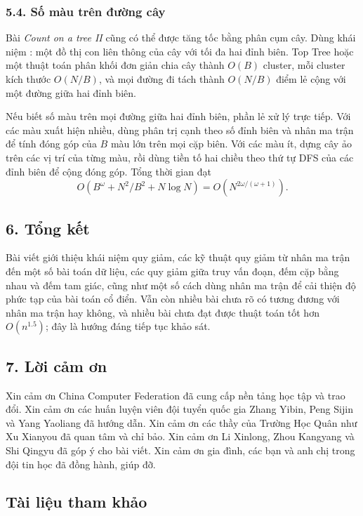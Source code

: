 \documentclass[11pt]{article}
\begin{document}
\subsubsection*{5.4. Số màu trên đường cây}

Bài \emph{Count on a tree II} cũng có thể được tăng tốc bằng phân cụm cây. Dùng
khái niệm : một đồ thị con liên thông của cây với tối đa hai
đỉnh biên. Top Tree hoặc một thuật toán phân khối đơn giản chia cây thành
\(O(B)\) cluster, mỗi cluster kích thước \(O(N/B)\), và mọi đường đi tách thành
\(O(N/B)\) điểm lẻ cộng với một đường giữa hai đỉnh biên.

Nếu biết số màu trên mọi đường giữa hai đỉnh biên, phần lẻ xử lý trực tiếp.
Với các màu xuất hiện nhiều, dùng phân trị cạnh theo số đỉnh biên và nhân ma
trận để tính đóng góp của \(B\) màu lớn trên mọi cặp biên. Với các màu ít,
dựng cây ảo trên các vị trí của từng màu, rồi dùng tiền tố hai chiều theo thứ
tự DFS của các đỉnh biên để cộng đóng góp. Tổng thời gian đạt
\[
  O(B^\omega+N^2/B^2+N\log N)=O(N^{2\omega/(\omega+1)}).
\]

\subsection*{6. Tổng kết}

Bài viết giới thiệu khái niệm quy giảm, các kỹ thuật quy giảm từ nhân ma trận
đến một số bài toán dữ liệu, các quy giảm giữa truy vấn đoạn, đếm cặp bằng
nhau và đếm tam giác, cũng như một số cách dùng nhân ma trận để cải thiện độ
phức tạp của bài toán cổ điển. Vẫn còn nhiều bài chưa rõ có tương đương với
nhân ma trận hay không, và nhiều bài chưa đạt được thuật toán tốt hơn
\(O(n^{1.5})\); đây là hướng đáng tiếp tục khảo sát.

\subsection*{7. Lời cảm ơn}

Xin cảm ơn China Computer Federation đã cung cấp nền tảng học tập và trao đổi.
Xin cảm ơn các huấn luyện viên đội tuyển quốc gia Zhang Yibin, Peng Sijin và
Yang Yaoliang đã hướng dẫn. Xin cảm ơn các thầy của Trường Học Quân như Xu
Xianyou đã quan tâm và chỉ bảo. Xin cảm ơn Li Xinlong, Zhou Kangyang và Shi
Qingyu đã góp ý cho bài viết. Xin cảm ơn gia đình, các bạn và anh chị trong đội
tin học đã đồng hành, giúp đỡ.

\subsection*{Tài liệu tham khảo}
\end{document}
